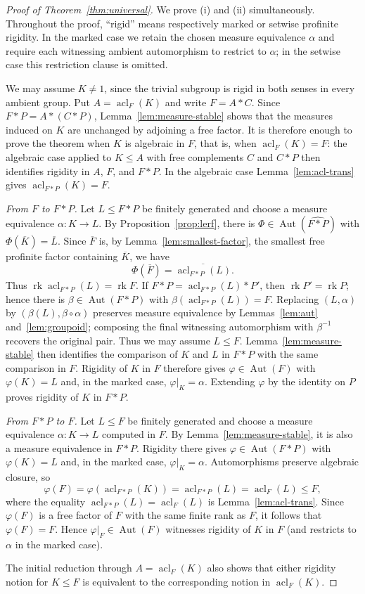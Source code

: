 \documentclass[11pt]{amsart}
\theoremstyle{plain}
\theoremstyle{definition}
\newcommand{\acl}{\operatorname{acl}}
\newcommand{\rk}{\operatorname{rk}}
\newcommand{\Aut}{\operatorname{Aut}}
\begin{document}
\begin{proof}[Proof of Theorem~\ref{thm:universal}]
We prove (i) and (ii) simultaneously. Throughout the proof, ``rigid'' means
respectively marked or setwise profinite rigidity. In the marked case we retain
the chosen measure equivalence $\alpha$ and require each witnessing ambient
automorphism to restrict to $\alpha$; in the setwise case this restriction
clause is omitted.

We may assume $K\neq1$, since the trivial subgroup is rigid in both senses in
every ambient group. Put $A=\acl_F(K)$ and write $F=A*C$. Since
$F*P=A*(C*P)$, Lemma~\ref{lem:measure-stable} shows that the measures induced on
$K$ are unchanged by adjoining a free factor. It is therefore enough to prove
the theorem when $K$ is algebraic in $F$, that is, when $\acl_F(K)=F$: the
algebraic case applied to $K\le A$ with free complements $C$ and $C*P$ then
identifies rigidity in $A$, $F$, and $F*P$. In the algebraic case
Lemma~\ref{lem:acl-trans} gives $\acl_{F*P}(K)=F$.

\medskip\noindent\emph{From $F$ to $F*P$.}
Let $L\le F*P$ be finitely generated and choose a measure equivalence
$\alpha\colon K\to L$. By Proposition~\ref{prop:lerf}, there is
$\Phi\in\Aut(\widehat{F*P})$ with $\Phi(\overline K)=\overline L$. Since
$\overline F$ is, by Lemma~\ref{lem:smallest-factor}, the smallest free
profinite factor containing $\overline K$, we have
\[
  \Phi(\overline F)=\overline{\acl_{F*P}(L)}.
\]
Thus $\rk\acl_{F*P}(L)=\rk F$. If
$F*P=\acl_{F*P}(L)*P'$, then $\rk P'=\rk P$; hence there is
$\beta\in\Aut(F*P)$ with $\beta(\acl_{F*P}(L))=F$. Replacing
$(L,\alpha)$ by $(\beta(L),\beta\circ\alpha)$ preserves measure
equivalence by Lemmas~\ref{lem:aut} and~\ref{lem:groupoid}; composing the
final witnessing automorphism with $\beta^{-1}$ recovers the original pair.
Thus we may assume $L\le F$. Lemma~\ref{lem:measure-stable} then identifies the comparison of
$K$ and $L$ in $F*P$ with the same comparison in $F$. Rigidity of $K$ in $F$
therefore gives $\varphi\in\Aut(F)$ with $\varphi(K)=L$ and, in the marked
case, $\varphi|_K=\alpha$. Extending $\varphi$ by the identity on $P$ proves
rigidity of $K$ in $F*P$.

\medskip\noindent\emph{From $F*P$ to $F$.}
Let $L\le F$ be finitely generated and choose a measure equivalence
$\alpha\colon K\to L$ computed in $F$. By Lemma~\ref{lem:measure-stable}, it is
also a measure equivalence in $F*P$. Rigidity there gives
$\varphi\in\Aut(F*P)$ with $\varphi(K)=L$ and, in the marked case,
$\varphi|_K=\alpha$. Automorphisms preserve algebraic closure, so
\[
  \varphi(F)=\varphi(\acl_{F*P}(K))
  =\acl_{F*P}(L)=\acl_F(L)\le F,
\]
where the equality $\acl_{F*P}(L)=\acl_F(L)$ is Lemma~\ref{lem:acl-trans}. Since $\varphi(F)$ is
a free factor of $F$ with the same finite rank as $F$, it follows that
$\varphi(F)=F$. Hence $\varphi|_F\in\Aut(F)$ witnesses rigidity of $K$ in $F$
(and restricts to $\alpha$ in the marked case).

The initial reduction through $A=\acl_F(K)$ also shows that either rigidity
notion for $K\le F$ is equivalent to the corresponding notion in
$\acl_F(K)$.
\end{proof}
\end{document}
